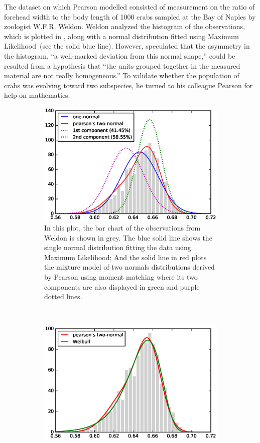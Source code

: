The dataset on which Pearson modelled consisted of measurement on the ratio of
forehead width to the body length of 1000 crabs sampled at the Bay of Naples by
zoologist W.F.R. Weldon. Weldon analyzed the histogram of the observations,
which is plotted in , along with a normal
distribution fitted using Maximum Likelihood~(see the solid blue line). However,
\citet{weldon1893certain} speculated that the asymmetry in the histogram, ``a
well-marked deviation from this normal shape,'' could be resulted from a
hypothesis that ``the units grouped together in the measured material are not
really homogeneous.'' To validate whether the population of crabs was evolving
toward two subspecies, he turned to his colleague Pearson for help on
mathematics.

\begin{figure}[ht!]
  \centering
  \begin{subfigure}[b]{0.95\textwidth}
  \centering
  \includegraphics[width=0.8\linewidth]{figures/pearson-crab.eps}
  \caption{In this plot, the bar chart of the observations from Weldon is shown
    in grey. The blue solid line shows the single normal distribution fitting
    the data using Maximum Likelihood; And the solid line in red plots the
    mixture model of two normals distributions derived by Pearson using moment
    matching where its two components are also displayed in green and purple
    dotted lines.}
  \label{fig::pearson-crab}
  \end{subfigure}
  ~
  \begin{subfigure}[b]{0.95\textwidth}
  \centering
  \includegraphics[width=0.8\linewidth]{figures/pearson-crab-weibull.eps}

\end{subfigure}
\end{figure}
